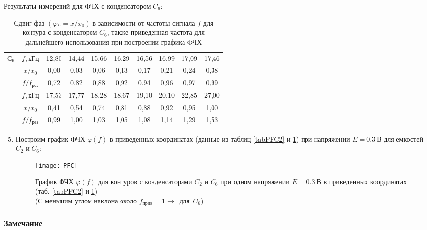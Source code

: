 \documentclass{lab}
\begin{document}
\newpage

Результаты измерений для ФЧХ с конденсатором $ C_6 $:

\begin{table}[H]
	\centering
	{
		\begin{tabular}{|c|c|cccccccc|}
			\hline
			\multirow{6}{*}{$С_6$}
			&$ f, кГц $		&	12,80	&	14,44	&	15,66	&	16,29	&	16,56	&	16,99	&	17,09	&	17,46	\\
			&$ x/x_0 $		&	0,00	&	0,03	&	0,06	&	0,13	&	0,17	&	0,21	&	0,24	&	0,38	\\
			&$ f/f_{рез} $	&	0,72	&	0,82	&	0,88	&	0,92	&	0,94	&	0,96	&	0,97	&	0,99	\\ \cline{2-10}
			&$ f, кГц $		&	17,53	&	17,77	&	18,28	&	18,67	&	19,10	&	20,10	&	22,85	&	27,00	\\
			&$ x/x_0 $		&	0,41	&	0,54	&	0,74	&	0,81	&	0,88	&	0,92	&	0,95	&	1,00	\\
			&$ f/f_{рез} $	&	0,99	&	1,00	&	1,03	&	1,05	&	1,08	&	1,14	&	1,29	&	1,53	\\ \hline
		\end{tabular}
	}
	\caption{\footnotesize
	Сдвиг фаз $ \left(\varphi\pi = x/x_0\right) $ в зависимости от частоты сигнала $ f $ для
	контура	с конденсатором $ C_6 $, также приведенная частота для дальнейшего использования при
	построении графика ФЧХ
	}
	\label{tabPFC6}
\end{table}

\begin{enumerate}

\setcounter{enumi}{4}		%

\item
Построим график ФЧХ $ \varphi(f) $ в приведенных координатах (данные из таблиц \ref{tabPFC2} и
\ref{tabPFC6}) при напряжении $ E = 0.3~В $ для емкостей $ C_2 $ и $ C_6 $:

\begin{figure}[H]
	\centering
	\texttt{[image: PFC]}
	\caption{\footnotesize
	График ФЧХ $ \varphi(f) $ для контуров с конденсаторами $ C_2 $ и $ C_6 $
	при одном напряжении $ E = 0.3~В $ в приведенных координатах
	(таб. \ref{tabPFC2} и \ref{tabPFC6})\\
	(С меньшим углом наклона около $ f_{прив} = 1 \longrightarrow $~для~$ C_6 $)
	}
	\label{PFC}
\end{figure}

\end{enumerate}

\subsubsection*{Замечание}
\end{document}
